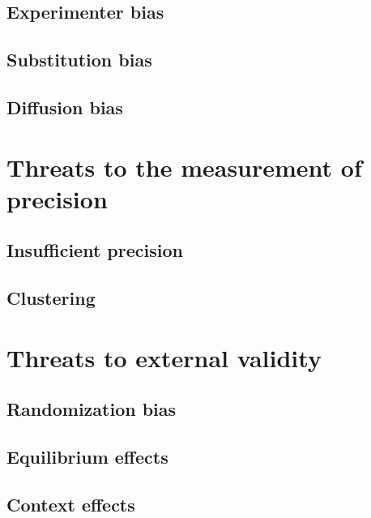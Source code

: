 \documentclass[]{book}
\theoremstyle{definition}
\theoremstyle{definition}
\theoremstyle{definition}
\theoremstyle{remark}
\begin{document}
\subsection{Experimenter bias}\label{experimenter-bias}

\subsection{Substitution bias}\label{substitution-bias}

\subsection{Diffusion bias}\label{diffusion-bias}

\section{Threats to the measurement of
precision}\label{threats-to-the-measurement-of-precision}

\subsection{Insufficient precision}\label{insufficient-precision}

\subsection{Clustering}\label{clustering}

\section{Threats to external
validity}\label{threats-to-external-validity}

\subsection{Randomization bias}\label{randomization-bias}

\subsection{Equilibrium effects}\label{equilibrium-effects}

\subsection{Context effects}\label{context-effects}
\end{document}

